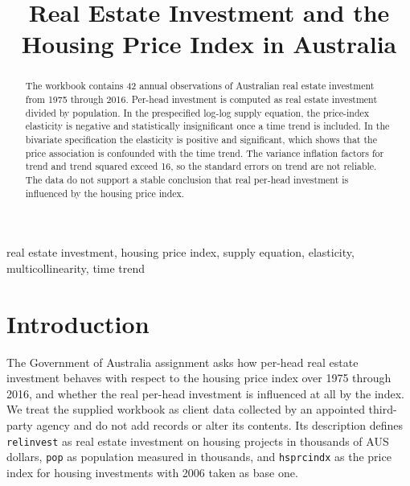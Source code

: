 \documentclass[conference]{IEEEtran}
\begin{document}
\title{Real Estate Investment and the Housing Price Index in Australia}

\author{
}

\maketitle

\begin{abstract}
The workbook contains 42 annual observations of Australian real estate investment from 1975 through 2016. Per-head investment is computed as real estate investment divided by population. In the prespecified log-log supply equation, the price-index elasticity is negative and statistically insignificant once a time trend is included. In the bivariate specification the elasticity is positive and significant, which shows that the price association is confounded with the time trend. The variance inflation factors for trend and trend squared exceed 16, so the standard errors on trend are not reliable. The data do not support a stable conclusion that real per-head investment is influenced by the housing price index.
\end{abstract}

\begin{IEEEkeywords}
real estate investment, housing price index, supply equation, elasticity, multicollinearity, time trend
\end{IEEEkeywords}

\section{Introduction}
The Government of Australia assignment asks how per-head real estate investment behaves with respect to the housing price index over 1975 through 2016, and whether the real per-head investment is influenced at all by the index. We treat the supplied workbook as client data collected by an appointed third-party agency and do not add records or alter its contents. Its description defines \texttt{relinvest} as real estate investment on housing projects in thousands of AUS dollars, \texttt{pop} as population measured in thousands, and \texttt{hsprcindx} as the price index for housing investments with 2006 taken as base one.
\end{document}
